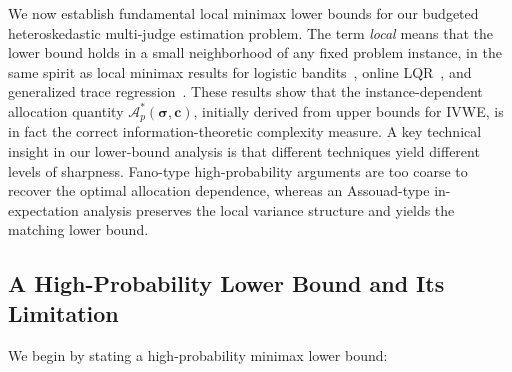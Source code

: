 \documentclass{article}
\def\vc{{\bm{c}}}
\def\gA{{\mathcal{A}}}
\theoremstyle{plain}
\theoremstyle{definition}
\theoremstyle{plain}
\newcommand{\ivwe}{\textsc{IVWE}}
\begin{document}
We now establish fundamental local minimax lower bounds for our budgeted heteroskedastic multi-judge estimation problem. The term \emph{local} means that the lower bound holds in a small neighborhood of any fixed problem instance, in the same spirit as local minimax results for logistic bandits~\citep[Theorem~2]{abeille2021logistic}, online LQR~\citep[Theorem~1]{simchowitz2020lqr}, and generalized trace regression~\citep[Theorem~4.1]{lee2026gl-lowpopart}. These results show that the instance-dependent allocation quantity \(\gA_p^*(\bm\sigma, \vc)\), initially derived from upper bounds for \ivwe{}, is in fact the correct information-theoretic complexity measure.  A key technical insight in our lower-bound analysis is that different techniques yield different levels of sharpness. Fano-type high-probability arguments are too coarse to recover the optimal allocation dependence, whereas an Assouad-type in-expectation analysis preserves the local variance structure and yields the matching lower bound.




\subsection{A High-Probability Lower Bound and Its Limitation}

We begin by stating a high-probability minimax lower bound:
\end{document}
